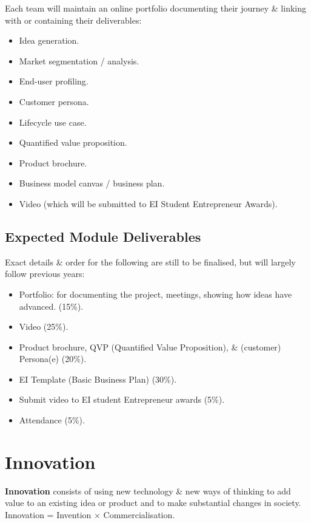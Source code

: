 \documentclass[a4paper,11pt]{article}
\begin{document}
Each team will maintain an online portfolio documenting their journey \& linking with or containing their deliverables:
\begin{multicols}{2}
\begin{itemize}
    \item   Idea generation.
    \item   Market segmentation / analysis.
    \item   End-user profiling.
    \item   Customer persona.
    \item   Lifecycle use case.
    \item   Quantified value proposition.
    \item   Product brochure.
    \item   Business model canvas / business plan.
    \item   Video (which will be submitted to EI Student Entrepreneur Awards).
\end{itemize}
\end{multicols}

\subsection{Expected Module Deliverables}
Exact details \& order for the following are still to be finalised, but will largely follow previous years:
\begin{itemize}
    \item   Portfolio: for documenting the project, meetings, showing how ideas have advanced. (15\%).
    \item   Video (25\%).
    \item   Product brochure, QVP (Quantified Value Proposition), \& (customer) Persona(e) (20\%).
    \item   EI Template (Basic Business Plan) (30\%).
    \item   Submit video to EI student Entrepreneur awards (5\%).
    \item   Attendance (5\%).
\end{itemize}

\section{Innovation}
\textbf{Innovation} consists of using new technology \& new ways of thinking to add value to an existing idea or
product and to make substantial changes in society.
Innovation = Invention $\times$ Commercialisation.
\end{document}
